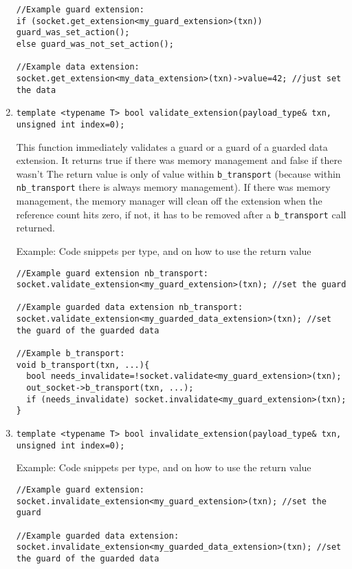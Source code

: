 \documentclass[a4paper,10pt]{article}          %
\begin{document}
\begin{enumerate}
\begin{small}
\begin{verbatim}
//Example guard extension:
if (socket.get_extension<my_guard_extension>(txn)) guard_was_set_action();
else guard_was_not_set_action();

//Example data extension:
socket.get_extension<my_data_extension>(txn)->value=42; //just set the data
\end{verbatim}
\end{small}

\item
\verb|template <typename T> bool validate_extension(payload_type& txn, unsigned int index=0);|

This function immediately validates a guard or a guard of a guarded data extension.
It returns true if there was memory management and false if there wasn't
The return value is only of value within \verb|b_transport| (because within \verb|nb_transport| there is always memory management).
If there was memory management, the memory manager will clean off the extension when the reference count hits zero, if not, it has to be removed after a \verb|b_transport| call returned.

Example: Code snippets per type, and on how to use the return value

\begin{small}
\begin{verbatim}
//Example guard extension nb_transport:
socket.validate_extension<my_guard_extension>(txn); //set the guard

//Example guarded data extension nb_transport:
socket.validate_extension<my_guarded_data_extension>(txn); //set the guard of the guarded data

//Example b_transport:
void b_transport(txn, ...){
  bool needs_invalidate=!socket.validate<my_guard_extension>(txn);
  out_socket->b_transport(txn, ...);
  if (needs_invalidate) socket.invalidate<my_guard_extension>(txn);
}
\end{verbatim}
\end{small}

\item
\verb|template <typename T> bool invalidate_extension(payload_type& txn, unsigned int index=0);|

Example: Code snippets per type, and on how to use the return value

\begin{small}
\begin{verbatim}
//Example guard extension:
socket.invalidate_extension<my_guard_extension>(txn); //set the guard

//Example guarded data extension:
socket.invalidate_extension<my_guarded_data_extension>(txn); //set the guard of the guarded data
\end{verbatim}
\end{small}

\end{enumerate}
\end{document}
